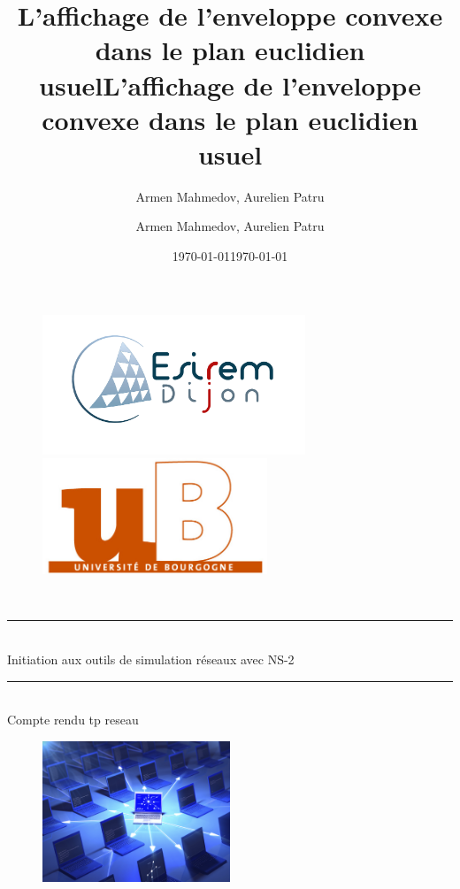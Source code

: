 \documentclass[11pt]{article}
\title{L'affichage de l'enveloppe convexe dans le plan euclidien usuel}
\author{Armen Mahmedov, Aurelien Patru}
\date{\today}
\title{L'affichage de l'enveloppe convexe dans le plan euclidien usuel}
\author{Armen Mahmedov, Aurelien Patru}
\date{\today}
\begin{document}
\begin{titlepage}
	\newcommand{\HRule}{\rule{\linewidth}{0.2mm}}     
            
	\begin{figure}[t]
		\begin{minipage}{0.5\textwidth}\large
			\begin{flushleft}
				\includegraphics[width=0.7\textwidth]{assets/logoEsirem.jpg}
			\end{flushleft}
		\end{minipage}
		\begin{minipage}{0.5\textwidth}\large
			\begin{flushright}
			\includegraphics[width=0.6\textwidth]{assets/logoUb.jpg}
			\end{flushright}
		\end{minipage}
	\end{figure}
	\textsc{ \\[1cm]}
     
     
	\begin{center}
	\HRule \\
	{\Large   
		Initiation aux outils de simulation réseaux avec NS-2
	}
	\HRule
	\\[0.5cm]
	{\large Compte rendu tp reseau \\}
   \end{center}

	\begin{figure}[h]
		\begin{center}
			\includegraphics[width=0.5\textwidth]{assets/main.jpg}
		\end{center}
	\end{figure}
        

\end{titlepage}
\end{document}
